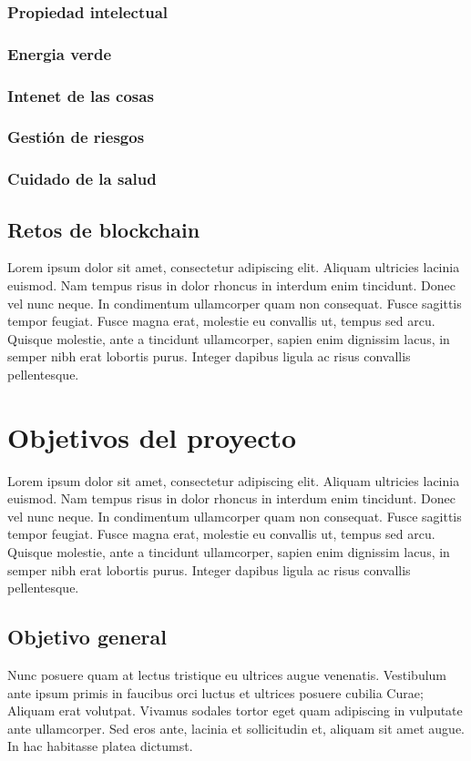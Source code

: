 \subsubsection{Propiedad intelectual}
\subsubsection{Energia verde}
\subsubsection{Intenet de las cosas}
\subsubsection{Gestión de riesgos}
\subsubsection{Cuidado de la salud}


\subsection{Retos de blockchain}
Lorem ipsum dolor sit amet, consectetur adipiscing elit. Aliquam ultricies lacinia euismod. Nam tempus risus in dolor rhoncus in interdum enim tincidunt. Donec vel nunc neque. In condimentum ullamcorper quam non consequat. Fusce sagittis tempor feugiat. Fusce magna erat, molestie eu convallis ut, tempus sed arcu. Quisque molestie, ante a tincidunt ullamcorper, sapien enim dignissim lacus, in semper nibh erat lobortis purus. Integer dapibus ligula ac risus convallis pellentesque.

\section{Objetivos del proyecto}

Lorem ipsum dolor sit amet, consectetur adipiscing elit. Aliquam ultricies lacinia euismod. Nam tempus risus in dolor rhoncus in interdum enim tincidunt. Donec vel nunc neque. In condimentum ullamcorper quam non consequat. Fusce sagittis tempor feugiat. Fusce magna erat, molestie eu convallis ut, tempus sed arcu. Quisque molestie, ante a tincidunt ullamcorper, sapien enim dignissim lacus, in semper nibh erat lobortis purus. Integer dapibus ligula ac risus convallis pellentesque.

\subsection{Objetivo general}
Nunc posuere quam at lectus tristique eu ultrices augue venenatis. Vestibulum ante ipsum primis in faucibus orci luctus et ultrices posuere cubilia Curae; Aliquam erat volutpat. Vivamus sodales tortor eget quam adipiscing in vulputate ante ullamcorper. Sed eros ante, lacinia et sollicitudin et, aliquam sit amet augue. In hac habitasse platea dictumst.

